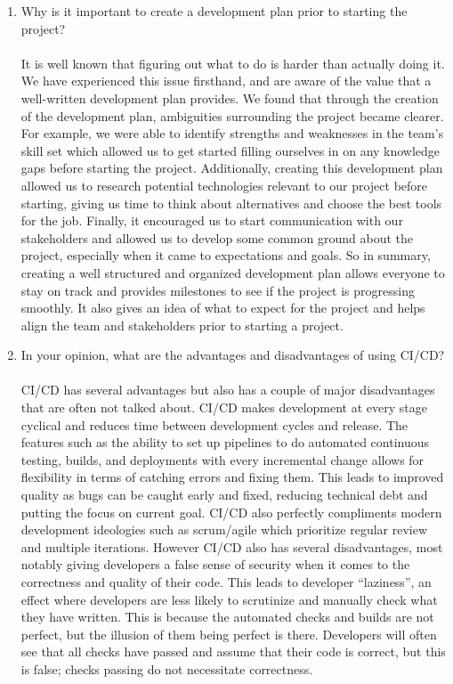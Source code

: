 \documentclass{article}
\begin{document}
\begin{enumerate}
  \item Why is it important to create a development plan prior to starting the
    project?\\
    \\
    It is well known that figuring out what to do is harder than actually doing it. We have experienced this
issue firsthand, and are aware of the value that a well-written development plan provides. We found
that through the creation of the development plan, ambiguities surrounding the project became
clearer. For example, we were able to identify strengths and weaknesses in the team’s skill set which
allowed us to get started filling ourselves in on any knowledge gaps before starting the project.
Additionally, creating this development plan allowed us to research potential technologies relevant to
our project before starting, giving us time to think about alternatives and choose the best tools for the
job. Finally, it encouraged us to start communication with our stakeholders and allowed us to develop
some common ground about the project, especially when it came to expectations and goals. So in
summary, creating a well structured and organized development plan allows everyone to stay on track
and provides milestones to see if the project is progressing smoothly. It also gives an idea of what to
expect for the project and helps align the team and stakeholders prior to starting a project.

  \item In your opinion, what are the advantages and disadvantages of using
    CI/CD?\\
    \\
    CI/CD has several advantages but also has a couple of major disadvantages that are often not talked
about. CI/CD makes development at every stage cyclical and reduces time between development cycles
and release. The features such as the ability to set up pipelines to do automated continuous testing,
builds, and deployments with every incremental change allows for flexibility in terms of catching errors
and fixing them. This leads to improved quality as bugs can be caught early and fixed, reducing
technical debt and putting the focus on current goal. CI/CD also perfectly compliments modern
development ideologies such as scrum/agile which prioritize regular review and multiple iterations.
However CI/CD also has several disadvantages, most notably giving developers a false sense of security
when it comes to the correctness and quality of their code. This leads to developer “laziness”, an effect
where developers are less likely to scrutinize and manually check what they have written. This is
because the automated checks and builds are not perfect, but the illusion of them being perfect is
there. Developers will often see that all checks have passed and assume that their code is correct, but
this is false; checks passing do not necessitate correctness.


\end{enumerate}
\end{document}
